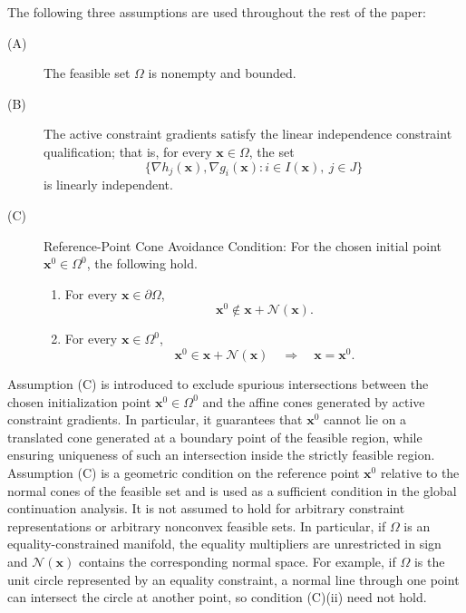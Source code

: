 \documentclass[11pt,pdflatex,sn-mathphys-ay]{sn-jnl}%
\theoremstyle{definition}
\theoremstyle{thmstyleone}%
\theoremstyle{thmstyletwo}%
\theoremstyle{thmstylethree}%
\newcommand{\add}[1]{\textcolor{revisionblue}{#1}}
\begin{document}
	The following three assumptions are used throughout the rest of the paper:
	\begin{description}
		\item[(A)] The feasible set $\Omega$ is nonempty and bounded.
		\item[(B)] The active constraint gradients satisfy the linear independence constraint qualification; that is, for every $\bm{x}\in\Omega$, the set
		\[
		\{\nabla h_j(\bm{x}),\nabla g_i(\bm{x}): i\in I(\bm{x}),\ j\in J\}
		\]
		is linearly independent.
		\item[(C)] Reference-Point Cone Avoidance Condition:
		For the chosen initial point $\bm{x}^0\in\Omega^0$, the following hold.
		
		\begin{enumerate}
			\item[(i)] For every $\bm{x}\in\partial\Omega$,
			\[
			\bm{x}^0\notin \bm{x}+\mathcal N(\bm{x}).
			\]
			
			\item[(ii)] For every $\bm{x}\in\Omega^0$,
			\[
			\bm{x}^0\in \bm{x}+\mathcal N(\bm{x})
			\quad\Longrightarrow\quad
			\bm{x}=\bm{x}^0.
			\]
		\end{enumerate}
		
	\end{description}
	Assumption (C) is introduced to exclude spurious intersections between the chosen initialization point $\bm{x}^0\in\Omega^0$ and the affine cones generated by active constraint gradients. In particular, it guarantees that $\bm{x}^0$ cannot lie on a translated cone generated at a boundary point of the feasible region, while ensuring uniqueness of such an intersection inside the strictly feasible region. 
	\add{Assumption (C) is a geometric condition on the reference point
		$\bm{x}^0$ relative to the normal cones of the feasible set and is
		used as a sufficient condition in the global continuation analysis.
		It is not assumed to hold for arbitrary constraint representations or
		arbitrary nonconvex feasible sets. In particular, if $\Omega$ is an
		equality-constrained manifold, the equality multipliers are
		unrestricted in sign and $\mathcal N(\bm{x})$ contains the
		corresponding normal space. For example, if $\Omega$ is the unit
		circle represented by an equality constraint, a normal line through
		one point can intersect the circle at another point, so condition
		(C)(ii) need not hold.}
	
\end{document}
